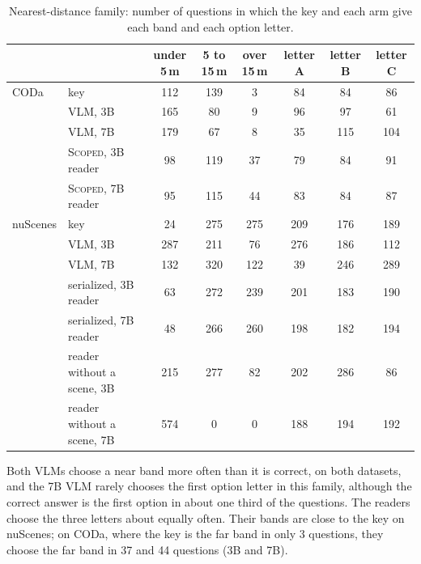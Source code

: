 \documentclass[10pt]{article}
\renewcommand{\thetable}{S\arabic{table}}
\newcommand{\fixtab}[1]{\renewcommand{\thetable}{#1}}
\begin{document}
\fixtab{S16b}\begin{table}[h]\centering\footnotesize
\caption{Nearest-distance family: number of questions in which the key and each arm give each band and each option letter.}\label{tab:s16b}
\setlength{\tabcolsep}{4pt}\begin{tabular}{@{}llcccccc@{}}
\toprule & & under 5\,m & 5 to 15\,m & over 15\,m & letter A & letter B & letter C \\ \midrule
CODa & key & 112 & 139 & 3 & 84 & 84 & 86 \\
 & VLM, 3B & 165 & 80 & 9 & 96 & 97 & 61 \\
 & VLM, 7B & 179 & 67 & 8 & 35 & 115 & 104 \\
 & \textsc{Scoped}, 3B reader & 98 & 119 & 37 & 79 & 84 & 91 \\
 & \textsc{Scoped}, 7B reader & 95 & 115 & 44 & 83 & 84 & 87 \\
\midrule nuScenes & key & 24 & 275 & 275 & 209 & 176 & 189 \\
 & VLM, 3B & 287 & 211 & 76 & 276 & 186 & 112 \\
 & VLM, 7B & 132 & 320 & 122 & 39 & 246 & 289 \\
 & serialized, 3B reader & 63 & 272 & 239 & 201 & 183 & 190 \\
 & serialized, 7B reader & 48 & 266 & 260 & 198 & 182 & 194 \\
 & reader without a scene, 3B & 215 & 277 & 82 & 202 & 286 & 86 \\
 & reader without a scene, 7B & 574 & 0 & 0 & 188 & 194 & 192 \\
\bottomrule
\end{tabular}
\end{table}

Both VLMs choose a near band more often than it is correct, on both datasets, and the 7B VLM rarely chooses the first option letter in this family, although the correct answer is the first option in about one third of the questions. The readers choose the three letters about equally often. Their bands are close to the key on nuScenes; on CODa, where the key is the far band in only 3 questions, they choose the far band in 37 and 44 questions (3B and 7B).
\end{document}
